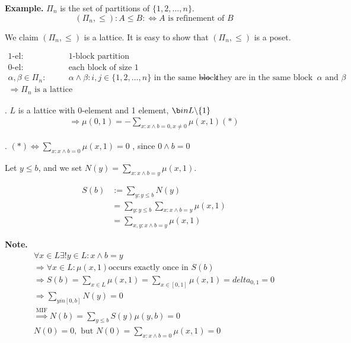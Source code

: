 \textbf{Example.}
$\Pi_n$ is the set of partitions of $\{1,2,..., n\}$. 
\[
    (\Pi_n, \leq): A \leq B: \iff \text{$A$ is refinement of $B$}
\]

We claim $(\Pi_n, \leq)$ is a lattice. 
It is easy to show that $(\Pi_n, \leq)$ is a poset. 

\begin{align*}
  \text{1-el}: & \text{1-block partition} \\
  \text{0-el}: & \text{each block of size 1} \\
  \alpha, \beta \in \Pi_n: & \alpha \wedge \beta: i,j \in \{1,2,\ldots,n\} 
    \text{ in the same block }
    & \implies \text{ they are in the same block of both $\alpha$ and $\beta$} \\
  \Rightarrow \Pi_n \text{ is a lattice}
\end{align*}

\Theorem.
$L$ is a lattice with 0-element and 1 element, $\b in L\backslash \{1\}$
\begin{align*}
    \Rightarrow \mu(0,1) = -\sum_{x: x\wedge b = 0, x \neq 0} \mu(x,1) (*)
\end{align*}

\Proof.
$(*) \Leftrightarrow \sum_{x: x\wedge b = 0} \mu(x,1) = 0$
, since $0 \wedge b = 0$

Let $y \leq b$, and we set $N(y) = \sum_{x: x\wedge b=y} \mu(x,1)$.

\begin{align*}
  S(b) &:= \sum_{y: y \leq b} N(y) \\
    & = \sum_{y: y \leq b} \sum_{x: x\wedge b=y} \mu(x,1) \\
    & = \sum_{x,y: x \wedge b = y} \mu(x,1)
\end{align*}

\textbf{Note.}
\begin{align*}
    \forall x \in L \exists ! y \in L : x \wedge b = y \\
    \Rightarrow \forall x \in L: \mu(x,1) \text{occurs exactly once in $S(b)$} \\
    \Rightarrow S(b) = \sum_{x \in L} \mu(x,1) = \sum_{x \in [0,1]} \mu(x,1) = delta_{0,1} = 0 \\
    \Rightarrow \sum_{y in [0,b]} N(y) = 0 \\
    \stackrel{\text{MIF}}{\Rightarrow} N(b) = \sum_{y \leq b} S(y) \mu(y,b) = 0\\
    N(0) = 0, \text{ but } N(0) = \sum_{x:x \wedge b = 0} \mu(x,1) = 0 \\
\end{align*}

